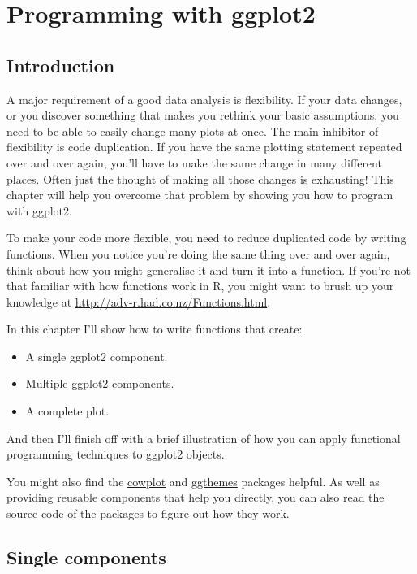 \chapter{Programming with ggplot2}\label{cha:programming}

\section{Introduction}

A major requirement of a good data analysis is flexibility. If your data
changes, or you discover something that makes you rethink your basic
assumptions, you need to be able to easily change many plots at once.
The main inhibitor of flexibility is code duplication. If you have the
same plotting statement repeated over and over again, you'll have to
make the same change in many different places. Often just the thought of
making all those changes is exhausting! This chapter will help you
overcome that problem by showing you how to program with ggplot2.

To make your code more flexible, you need to reduce duplicated code by
writing functions. When you notice you're doing the same thing over and
over again, think about how you might generalise it and turn it into a
function. If you're not that familiar with how functions work in R, you
might want to brush up your knowledge at
\url{http://adv-r.had.co.nz/Functions.html}.

In this chapter I'll show how to write functions that create:

\begin{itemize}
\tightlist
\item
  A single ggplot2 component.
\item
  Multiple ggplot2 components.
\item
  A complete plot.
\end{itemize}

And then I'll finish off with a brief illustration of how you can apply
functional programming techniques to ggplot2 objects.

You might also find the
\href{https://github.com/wilkelab/cowplot}{cowplot} and
\href{https://github.com/jrnold/ggthemes}{ggthemes} packages helpful. As
well as providing reusable components that help you directly, you can
also read the source code of the packages to figure out how they work.

\section{Single components}


